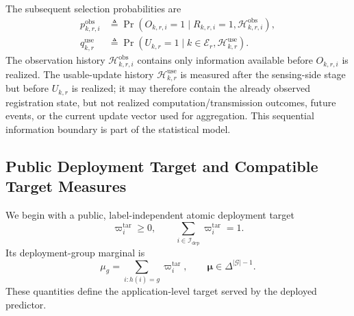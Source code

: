 \documentclass[letterpaper,journal]{IEEEtran}
\begin{document}
The subsequent selection probabilities are
\begin{align}
 p^{\mathrm{obs}}_{k,r,i}
 &\triangleq
 \Pr\!\left(
 O_{k,r,i}=1
 \mid
 R_{k,r,i}=1,\mathcal{H}^{\mathrm{obs}}_{k,r,i}
 \right),
 \label{eq:pobs_def}\\
 q^{\mathrm{use}}_{k,r}
 &\triangleq
 \Pr\!\left(
 U_{k,r}=1
 \mid
 k\in\mathcal{E}_r,\mathcal{H}^{\mathrm{use}}_{k,r}
 \right).
 \label{eq:quse_def}
\end{align}
The observation history $\mathcal{H}^{\mathrm{obs}}_{k,r,i}$ contains only
information available before $O_{k,r,i}$ is realized.  The usable-update
history $\mathcal{H}^{\mathrm{use}}_{k,r}$ is measured after the sensing-side
stage but before $U_{k,r}$ is realized; it may therefore contain the already
observed registration state, but not realized computation/transmission
outcomes, future events, or the current update vector used for aggregation.
This sequential information boundary is part of the statistical model.

\subsection{Public Deployment Target and Compatible Target Measures}
\label{subsec:target_measures}

We begin with a public, label-independent atomic deployment target
\begin{equation}
    \varpi_i^{\mathrm{tar}}\ge0,
    \qquad
    \sum_{i\in\mathcal{I}_{\mathrm{dep}}}
    \varpi_i^{\mathrm{tar}}=1.
    \label{eq:atomic_target}
\end{equation}
Its deployment-group marginal is
\begin{equation}
    \mu_g
    =
    \sum_{i:h(i)=g}\varpi_i^{\mathrm{tar}},
    \qquad
    \boldsymbol{\mu}\in\Delta^{|\mathcal{G}|-1}.
    \label{eq:target_group_mass}
\end{equation}
These quantities define the application-level target served by the deployed
predictor.
\end{document}
